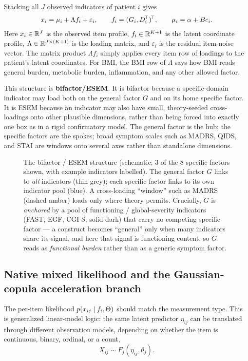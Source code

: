 Stacking all $J$ observed indicators of patient $i$ gives
\begin{equation}
\label{eq:xstack}
x_i = \mu_i + \Lambda f_i + \varepsilon_i,
\qquad
f_i=(G_i,D_i^{\!\top})^{\!\top},
\qquad
\mu_i=\alpha+Bc_i .
\end{equation}
Here $x_i\in\mathbb{R}^J$ is the observed item profile, $f_i\in\mathbb{R}^{K+1}$ is the latent coordinate profile,
$\Lambda\in\mathbb{R}^{J\times(K+1)}$ is the loading matrix, and $\varepsilon_i$ is the residual item-noise vector. The
matrix product $\Lambda f_i$ simply applies every item row of loadings to the patient's latent coordinates. For
BMI, the BMI row of $\Lambda$ says how BMI reads general burden, metabolic burden, inflammation, and any other
allowed factor.

This structure is \textbf{bifactor/ESEM}. It is bifactor because a specific-domain indicator may load both on
the general factor $G$ and on its home specific factor. It is ESEM because an indicator may also have small,
theory-seeded cross-loadings onto other plausible dimensions, rather than being forced into exactly one box as in
a rigid confirmatory model. The general factor is the hub; the specific factors are the spokes; broad symptom
scales such as MADRS, QIDS, and STAI are windows onto several axes rather than standalone dimensions.

\begin{figure}[h]\centering
\bifactordiagram
\caption{The bifactor / ESEM structure (schematic; 3 of the 8 specific factors shown, with example indicators
labelled). The general factor $G$ links to \emph{all} indicators (thin grey); each specific factor links to its
own indicator pool (blue). A cross-loading ``window'' such as MADRS (dashed amber) loads only where theory
permits. Crucially, $G$ is \emph{anchored} by a pool of functioning / global-severity indicators (FAST, EGF,
CGI-S; solid dark) that carry no competing specific factor --- a construct becomes ``general'' only when many
indicators share its signal, and here that signal is functioning content, so $G$ reads as \emph{functional
burden} rather than as a generic symptom factor.}
\label{fig:bifactor}
\end{figure}

\subsection{Native mixed likelihood and the Gaussian-copula acceleration branch}
\label{sub:mixed}
The per-item likelihood $p(x_{ij}\mid f_i,\Theta)$ should match the measurement type. This is generalized
linear-model logic: the same latent predictor $\eta_{ij}$ can be translated through different observation models,
depending on whether the item is continuous, binary, ordinal, or a count,
\begin{equation}
X_{ij}\sim F_j(\eta_{ij},\theta_j).
\end{equation}


